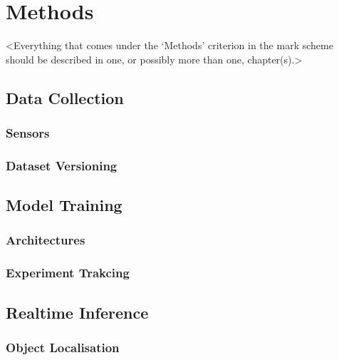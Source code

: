 \chapter{Methods}
\label{chapter2}

<Everything that comes under the `Methods' criterion in the mark scheme should be described in one, or possibly more than one, chapter(s).>

\section{Data Collection}
\lipsum[5]

\subsection{Sensors}
\lipsum[6]

\subsection{Dataset Versioning}
\lipsum[6]



\section{Model Training}
\lipsum[7]

\subsection{Architectures}
\lipsum[6]

\subsection{Experiment Trakcing}
\lipsum[6]



\section{Realtime Inference}
\lipsum[7]

\subsection{Object Localisation}
\lipsum[6]